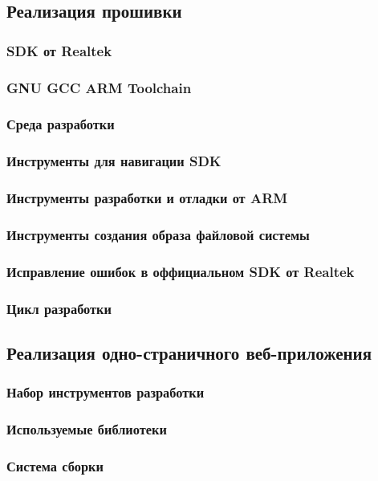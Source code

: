 \subsection{Реализация прошивки}
\subsubsection{SDK от Realtek}
\subsubsection{GNU GCC ARM Toolchain}
\subsubsection{Среда разработки}
\subsubsection{Инструменты для навигации SDK}
\subsubsection{Инструменты разработки и отладки от ARM}
\subsubsection{Инструменты создания образа файловой системы}
\subsubsection{Исправление ошибок в оффициальном SDK от Realtek}
\subsubsection{Цикл разработки}



\subsection{Реализация одно-страничного веб-приложения}
\subsubsection{Набор инструментов разработки}
\subsubsection{Используемые библиотеки}
\subsubsection{Система сборки}
